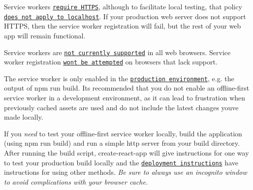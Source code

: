 \begin{DoxyEnumerate}
\item Service workers \href{https://developers.google.com/web/fundamentals/getting-started/primers/service-workers#you_need_https}{\tt require H\+T\+T\+PS}, although to facilitate local testing, that policy \href{http://stackoverflow.com/questions/34160509/options-for-testing-service-workers-via-http/34161385#34161385}{\tt does not apply to {\ttfamily localhost}}. If your production web server does not support H\+T\+T\+PS, then the service worker registration will fail, but the rest of your web app will remain functional.
\end{DoxyEnumerate}
\begin{DoxyEnumerate}
\item Service workers are \href{https://jakearchibald.github.io/isserviceworkerready/}{\tt not currently supported} in all web browsers. Service worker registration \href{src/registerServiceWorker.js}{\tt won\textquotesingle{}t be attempted} on browsers that lack support.
\end{DoxyEnumerate}
\begin{DoxyEnumerate}
\item The service worker is only enabled in the \href{#deployment}{\tt production environment}, e.\+g. the output of {\ttfamily npm run build}. It\textquotesingle{}s recommended that you do not enable an offline-\/first service worker in a development environment, as it can lead to frustration when previously cached assets are used and do not include the latest changes you\textquotesingle{}ve made locally.
\end{DoxyEnumerate}
\begin{DoxyEnumerate}
\item If you {\itshape need} to test your offline-\/first service worker locally, build the application (using {\ttfamily npm run build}) and run a simple http server from your build directory. After running the build script, {\ttfamily create-\/react-\/app} will give instructions for one way to test your production build locally and the \href{#deployment}{\tt deployment instructions} have instructions for using other methods. {\itshape Be sure to always use an incognito window to avoid complications with your browser cache.}
\end{DoxyEnumerate}
